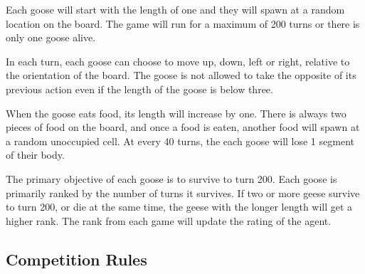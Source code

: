 Each goose will start with the length of one and they will spawn at a random location on the board. The game will run for a maximum of 200 turns or there is only one goose alive.


In each turn, each goose can choose to move up, down, left or right, relative to the orientation of the board. The goose is not allowed to take the opposite of its previous action even if the length of the goose is below three.

When the goose eats food, its length will increase by one. There is always two pieces of food on the board, and once a food is eaten, another food will spawn at a random unoccupied cell. At every 40 turns, the each goose will lose 1 segment of their body.


The primary objective of each goose is to survive to turn 200. Each goose is primarily ranked by the number of turns it survives. If two or more geese survive to turn 200, or die at the same time, the geese with the longer length will get a higher rank. The rank from each game will update the rating of the agent.



\subsection{Competition Rules}
\label{subsection_competition}

